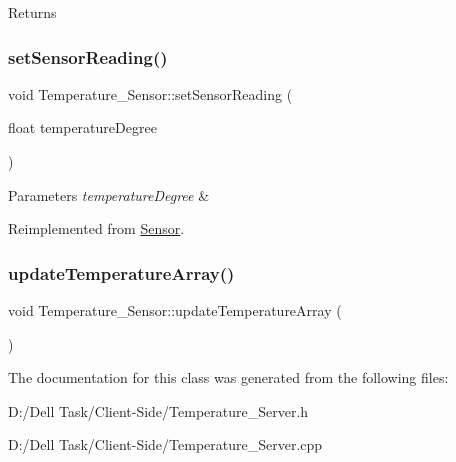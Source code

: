 \begin{DoxyReturn}{Returns}

\end{DoxyReturn}
\mbox{\label{class_temperature___sensor_a9dcb003cce1faf22a5a22071ca95b2b4}} 
\subsubsection{\texorpdfstring{set\+Sensor\+Reading()}{setSensorReading()}}
{\footnotesize\ttfamily void Temperature\+\_\+\+Sensor\+::set\+Sensor\+Reading (\begin{DoxyParamCaption}\item[{float}]{temperature\+Degree }\end{DoxyParamCaption})\hspace{0.3cm}{\ttfamily [virtual]}}






\begin{DoxyParams}{Parameters}
{\em temperature\+Degree} & \\
\hline
\end{DoxyParams}


Reimplemented from \mbox{\hyperlink{class_sensor_aa89b192e3203c85e62599c6239f01225}{Sensor}}.

\mbox{\label{class_temperature___sensor_aab99e13937e839433d86f1b946e82e6b}} 
\subsubsection{\texorpdfstring{update\+Temperature\+Array()}{updateTemperatureArray()}}
{\footnotesize\ttfamily void Temperature\+\_\+\+Sensor\+::update\+Temperature\+Array (\begin{DoxyParamCaption}{ }\end{DoxyParamCaption})}







The documentation for this class was generated from the following files\+:\begin{DoxyCompactItemize}
\item 
D\+:/\+Dell Task/\+Client-\/\+Side/Temperature\+\_\+\+Server.\+h\item 
D\+:/\+Dell Task/\+Client-\/\+Side/Temperature\+\_\+\+Server.\+cpp\end{DoxyCompactItemize}
